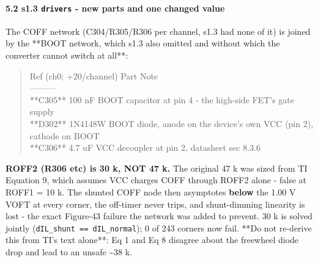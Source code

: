 \documentclass[11pt,a4paper]{article}
\begin{document}
\paragraph*{5.2 s1.3 \texttt{drivers} - new parts and one changed value}
The COFF network (C304/R305/R306 per channel, s1.3 had none of it) is joined by the {*}{*}BOOT network, which s1.3 also omitted and without which the converter cannot switch at all{*}{*}:

\begin{quote}\small\ttfamily\raggedright
\textbar{} Ref (ch0; +20/channel) \textbar{} Part \textbar{} Note \textbar{}\\
\textbar{}---\textbar{}---\textbar{}---\textbar{}\\
\textbar{} {*}{*}C305{*}{*} \textbar{} 100 nF \textbar{} BOOT capacitor at pin 4 - the high-side FET's gate supply \textbar{}\\
\textbar{} {*}{*}D302{*}{*} \textbar{} 1N4148W \textbar{} BOOT diode, anode on the device's own VCC (pin 2), cathode on BOOT \textbar{}\\
\textbar{} {*}{*}C306{*}{*} \textbar{} 4.7 uF \textbar{} VCC decoupler at pin 2, datasheet sec 8.3.6 \textbar{}
\end{quote}
\textbf{ROFF2 (R306 etc) is 30 k, NOT 47 k.} The original 47 k was sized from TI Equation 9, which assumes VCC charges COFF through ROFF2 alone - false at ROFF1 = 10 k. The shunted COFF node then asymptotes \textbf{below} the 1.00 V VOFT at every corner, the off-timer never trips, and shunt-dimming linearity is lost - the exact Figure-43 failure the network was added to prevent. 30 k is solved jointly (\texttt{dIL\_shunt == dIL\_normal}); 0 of 243 corners now fail. {*}{*}Do not re-derive this from TI's text alone{*}{*}: Eq 1 and Eq 8 disagree about the freewheel diode drop and lead to an unsafe \textasciitilde{}38 k.
\end{document}
